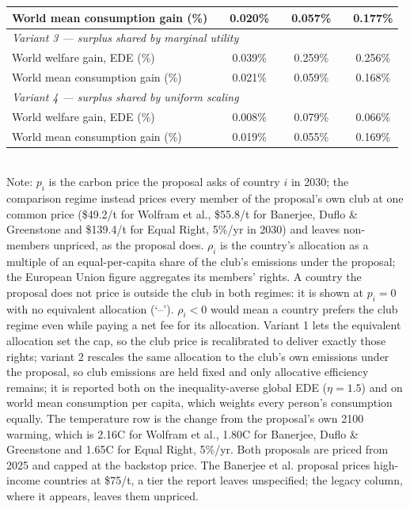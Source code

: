 \begin{table}[htbp]
\begin{tabular}{lcccccc}
  \quad World mean consumption gain (\%) &  & 0.020\% &  & 0.057\% &  & 0.177\% \\
  \midrule
  \multicolumn{7}{l}{\textit{Variant 3 --- surplus shared by marginal utility}} \\
  \quad World welfare gain, EDE (\%) &  & 0.039\% &  & 0.259\% &  & 0.256\% \\
  \quad World mean consumption gain (\%) &  & 0.021\% &  & 0.059\% &  & 0.168\% \\
  \midrule
  \multicolumn{7}{l}{\textit{Variant 4 --- surplus shared by uniform scaling}} \\
  \quad World welfare gain, EDE (\%) &  & 0.008\% &  & 0.079\% &  & 0.066\% \\
  \quad World mean consumption gain (\%) &  & 0.019\% &  & 0.055\% &  & 0.169\% \\
  \bottomrule
\end{tabular}
\label{tab:equiv_rights_B}
\\[4pt]
{\footnotesize Note: $p_i$ is the carbon price the proposal asks of country $i$ in 2030; the comparison regime instead prices every member of the proposal's own club at one common price (\$49.2/t for Wolfram et al., \$55.8/t for Banerjee, Duflo \& Greenstone and \$139.4/t for Equal Right, 5\%/yr in 2030) and leaves non-members unpriced, as the proposal does. $\rho_i$ is the country's allocation as a multiple of an equal-per-capita share of the club's emissions under the proposal; the European Union figure aggregates its members' rights. A country the proposal does not price is outside the club in both regimes: it is shown at $p_i=0$ with no equivalent allocation (`--'). $\rho_i < 0$ would mean a country prefers the club regime even while paying a net fee for its allocation. Variant 1 lets the equivalent allocation set the cap, so the club price is recalibrated to deliver exactly those rights; variant 2 rescales the same allocation to the club's own emissions under the proposal, so club emissions are held fixed and only allocative efficiency remains; it is reported both on the inequality-averse global EDE ($\eta=1.5$) and on world mean consumption per capita, which weights every person's consumption equally. The temperature row is the change from the proposal's own 2100 warming, which is 2.16\textdegree{}C for Wolfram et al., 1.80\textdegree{}C for Banerjee, Duflo \& Greenstone and 1.65\textdegree{}C for Equal Right, 5\%/yr. Both proposals are priced from 2025 and capped at the backstop price. The Banerjee et al. proposal prices high-income countries at \$75/t, a tier the report leaves unspecified; the legacy column, where it appears, leaves them unpriced.}
\end{table}
